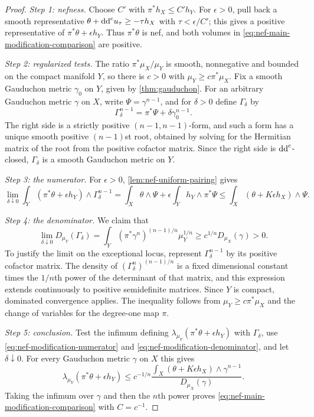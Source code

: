 \begin{proof}
\emph{Step 1: nefness.} Choose $C'$ with $\pi^*h_X\leq C'h_Y$. For $\epsilon>0$, pull back a smooth representative $\theta+\mathrm{dd}^{\mathrm{c}} u_\tau\geq-\tau h_X$ with $\tau<\epsilon/C'$; this gives a positive representative of $\pi^*\theta+\epsilon h_Y$. Thus $\pi^*\theta$ is nef, and both volumes in \eqref{eq:nef-main-modification-comparison} are positive.

\emph{Step 2: regularized tests.} The ratio $\pi^*\mu_X/\mu_Y$ is smooth, nonnegative and bounded on the compact manifold $Y$, so there is $c>0$ with $\mu_Y\geq c\pi^*\mu_X$. Fix a smooth Gauduchon metric $\gamma_0$ on $Y$, given by \cref{thm:gauduchon}. For an arbitrary Gauduchon metric $\gamma$ on $X$, write $\Psi=\gamma^{n-1}$, and for $\delta>0$ define $\Gamma_\delta$ by
\[
 \Gamma_\delta^{n-1}=\pi^*\Psi+\delta\gamma_0^{n-1}.
\]
The right side is a strictly positive $(n-1,n-1)$-form, and such a form has a unique smooth positive $(n-1)$st root, obtained by solving for the Hermitian matrix of the root from the positive cofactor matrix. Since the right side is $\mathrm{dd}^{\mathrm{c}}$-closed, $\Gamma_\delta$ is a smooth Gauduchon metric on $Y$.

\emph{Step 3: the numerator.} For $\epsilon>0$, \cref{lem:nef-uniform-pairing} gives
\begin{equation}\label{eq:nef-modification-numerator}
 \lim_{\delta\downarrow0}\int_Y(\pi^*\theta+\epsilon h_Y)
 \wedge\Gamma_\delta^{n-1}
 =\int_X\theta\wedge\Psi+\epsilon\int_Yh_Y\wedge\pi^*\Psi
 \leq\int_X(\theta+K\epsilon h_X)\wedge\Psi.
\end{equation}

\emph{Step 4: the denominator.} We claim that
\begin{equation}\label{eq:nef-modification-denominator}
 \lim_{\delta\downarrow0}D_{\mu_Y}(\Gamma_\delta)
 =\int_Y(\pi^*\gamma^n)^{(n-1)/n}\mu_Y^{1/n}
 \geq c^{1/n}D_{\mu_X}(\gamma)>0.
\end{equation}
To justify the limit on the exceptional locus, represent $\Gamma_\delta^{n-1}$ by its positive cofactor matrix. The density of $(\Gamma_\delta^n)^{(n-1)/n}$ is a fixed dimensional constant times the $1/n$th power of the determinant of that matrix, and this expression extends continuously to positive semidefinite matrices. Since $Y$ is compact, dominated convergence applies. The inequality follows from $\mu_Y\geq c\pi^*\mu_X$ and the change of variables for the degree-one map $\pi$.

\emph{Step 5: conclusion.} Test the infimum defining $\lambda_{\mu_Y}(\pi^*\theta+\epsilon h_Y)$ with $\Gamma_\delta$, use \eqref{eq:nef-modification-numerator} and \eqref{eq:nef-modification-denominator}, and let $\delta\downarrow0$. For every Gauduchon metric $\gamma$ on $X$ this gives
\[
 \lambda_{\mu_Y}(\pi^*\theta+\epsilon h_Y)
 \leq c^{-1/n}
 \frac{\int_X(\theta+K\epsilon h_X)\wedge\gamma^{n-1}}{D_{\mu_X}(\gamma)}.
\]
Taking the infimum over $\gamma$ and then the $n$th power proves \eqref{eq:nef-main-modification-comparison} with $C=c^{-1}$.


\end{proof}
